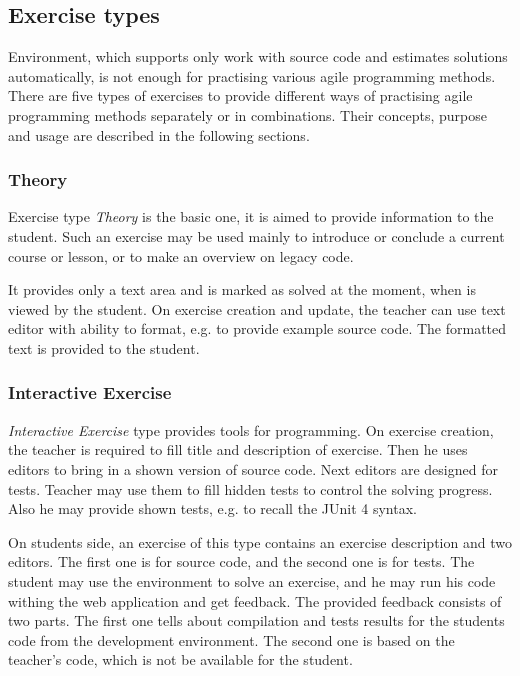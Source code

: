         \subsection{Exercise types}
        \label{subsec:exercise-types}
        Environment, which supports only work with source code and estimates solutions automatically, is not enough for practising various agile programming methods. There are five types of exercises to provide different ways of practising agile programming methods separately or in combinations. Their concepts, purpose and usage are described in the following sections.
            
            \subsubsection{Theory}
            Exercise type \textit{Theory} is the basic one, it is aimed to provide information to the student. Such an exercise may be used mainly to introduce or conclude a current course or lesson, or to make an overview on legacy code.
            
            It provides only a text area and is marked as solved at the moment, when is viewed by the student. On exercise creation and update, the teacher can use text editor with ability to format, e.g. to provide example source code. The formatted text is provided to the student.
        
            \subsubsection{Interactive Exercise}
            \label{subsubsec:whitebox}
            \textit{Interactive Exercise} type provides tools for programming.
            On exercise creation, the teacher is required to fill title and description of exercise. Then he uses editors to bring in a shown version of source code. Next editors are designed for tests. Teacher may use them to fill hidden tests to control the solving progress. Also he may provide shown tests, e.g. to recall the JUnit 4 syntax.
            
            On students side, an exercise of this type contains an exercise description and two editors. The first one is for source code, and the second one is for tests. The student may use the environment to solve an exercise, and he may run his code withing the web application and get feedback. The provided feedback consists of two parts. The first one tells about compilation and tests results for the students code from the development environment. The second one is based on the teacher's code, which is not be available for the student.
            
